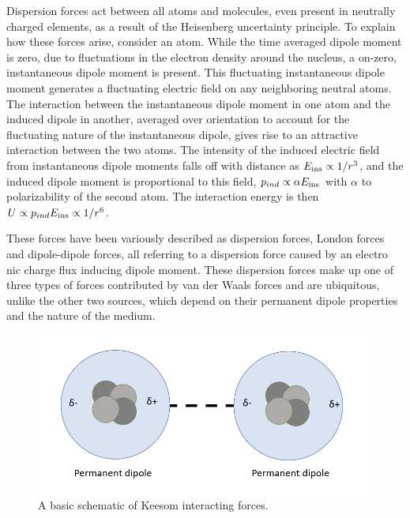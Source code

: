 Dispersion forces act between all atoms and molecules, even present in neutrally charged elements, 
as a result of the Heisenberg uncertainty principle.\cite{}
To explain how these forces arise, consider an atom. While the time averaged dipole moment is zero, due to %
fluctuations in the electron density around the nucleus, a %
on-zero, instantaneous dipole moment is present. This fluctuating instantaneous dipole moment generates a fluctuating electric field on any neighboring neutral atoms. The interaction between the instantaneous dipole moment in %
one atom and the induced dipole in another, averaged over orientation to account for the fluctuating nature of the instantaneous dipole, gives rise to an attractive interaction between the two atoms. The intensity of the induced electric field from instantaneous dipole moments falls off with distance as $E_{\rm ins} \propto 1/r^3$, and the induced dipole moment is proportional to this field, $p_{ind} \propto \alpha E_{\rm ins}$ with $\alpha$ to polarizability of the second atom. The interaction energy is then $U \propto p_{ind}E_{\rm ins} \propto 1/r^6$. 

These forces have been variously described as dispersion forces, London forces \cite{London} and dipole-dipole forces, all %
referring to a dispersion force caused by an electro%
nic charge flux inducing dipole moment. These dispersion forces make up one of three types of forces contributed by van der Waals forces and%
are ubiquitous, unlike the other two sources, which depend on their permanent dipole properties and the nature of the medium. \cite{IsGreenBook}


\cite{lilBlueBook} \cite{IsGreenBook}  \cite{FoundColloidBook}



\begin{figure}[h!!!!!!!!!!!!!!!!!!!!!!!!!]     %
        \begin{center}
          \includegraphics[width=110mm]{chapter1/keesom.PNG}
\end{center}
\caption{A basic schematic of Keesom interacting forces.}
\label{fig:keesom}                 %
\end{figure}



